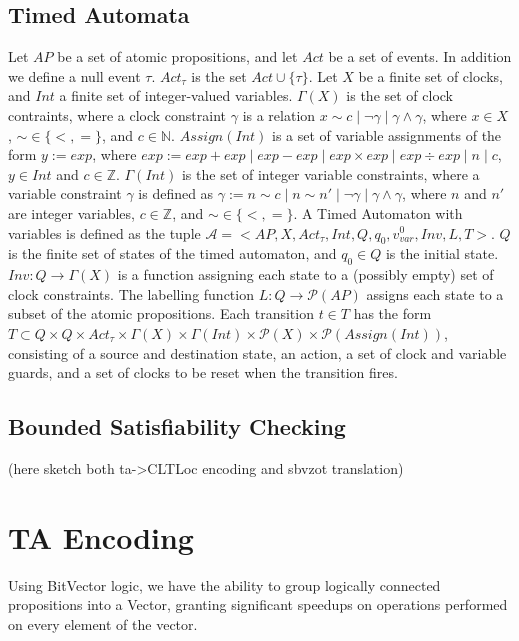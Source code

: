 \documentclass[a4paper,11pt]{article}
\newcommand*\BitOr{\mathbin{|}}
\begin{document}
\subsection{Timed Automata}
\label{sec:org5ce4535}
Let \(AP\) be a set of atomic propositions, and let \(Act\) be a set of events.
In addition we define a null event \(\tau\). \(Act_{\tau}\) is the set \(Act
\cup \{\tau\}\). Let \(X\) be a finite set of clocks, and \(Int\) a finite set
of integer-valued variables. \(\Gamma(X)\) is the set of clock contraints, where
a clock constraint \(\gamma\) is a relation \(x \sim c \BitOr \neg \gamma\BitOr
\gamma \land \gamma\), where \(x \in X\), \(\sim \in \{<,=\}\), and \(c \in
\mathbb{N}\). \(Assign(Int)\) is a set of variable assignments of the form \(y
:= exp\), where \(exp := exp + exp\BitOr exp - exp\BitOr exp \times exp\BitOr exp \div
exp\BitOr n\BitOr c\), \(y \in Int\) and \(c \in \mathbb{Z}\). \(\Gamma(Int)\) is
the set of integer variable constraints, where a variable constraint \(\gamma\)
is defined as \(\gamma := n \sim c\BitOr n \sim n'\BitOr \neg \gamma\BitOr \gamma
\land \gamma\), where \(n\) and \(n'\) are integer variables, \(c \in
\mathbb{Z}\), and \(\sim \in \{<,=\}\). A Timed Automaton with variables is
defined as the tuple \(\mathcal{A} = <AP,X, Act_{\tau}, Int, Q, q_0, v_{var}^0,
Inv, L, T>\). \(Q\) is the finite set of states of the timed automaton, and
\(q_0 \in Q\) is the initial state. \(Inv : Q \rightarrow \Gamma(X)\) is a
function assigning each state to a (possibly empty) set of clock constraints.
The labelling function \(L: Q \rightarrow \mathcal{P}(AP)\) assigns each state
to a subset of the atomic propositions. Each transition \(t \in T\)
has the form \(T \subset Q \times Q \times Act_{\tau} \times \Gamma(X)
\times \Gamma(Int) \times \mathcal{P}(X) \times \mathcal{P}(Assign(Int))\),
consisting of a source and destination state, an action, a set of clock and
variable guards, and a set of clocks to be reset when the transition fires.

\subsection{Bounded Satisfiability Checking}
\label{sec:org76cff86}
(here sketch both ta->CLTLoc encoding and sbvzot translation)
\section{TA Encoding}
\label{sec:org53dc3ff}
Using BitVector logic, we have the ability to group logically connected
propositions into a Vector, granting significant speedups on operations
performed on every element of the vector.
\end{document}
